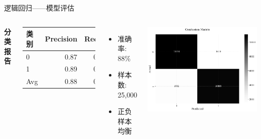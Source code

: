 \documentclass{beamer}
\begin{document}
\begin{frame}{逻辑回归——模型评估}
    \begin{columns}
        \textbf{分类报告}
        \begin{table}[h]
            \small
            \begin{tabular}{lrrr}
                \hline
                类别 & Precision & Recall & F1 \\
                \hline
                0 & 0.87 & 0.89 & 0.88 \\
                1 & 0.89 & 0.87 & 0.88 \\
                \hline
                Avg & 0.88 & 0.88 & 0.88 \\
                \hline
            \end{tabular}
        \end{table}

        \vspace{0.3cm}
        \begin{itemize}
            \item 准确率: 88\%
            \item 样本数: 25,000
            \item 正负样本均衡
        \end{itemize}

        \begin{center}
            \includegraphics[width=1.3\textwidth]{pic/LR6.png}
        \end{center}
    \end{columns}
\end{frame}
\end{document}
